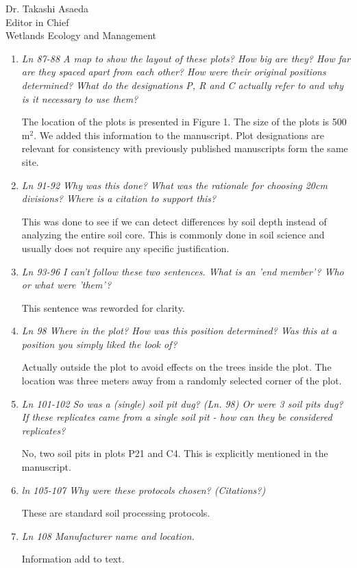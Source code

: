 \documentclass[11pt]{bgcletter}
\begin{document}
\begin{letter}{Dr. Takashi Asaeda\\
 Editor in Chief \\ Wetlands Ecology and Management}
\begin{enumerate}
\item {\it Ln 87-88 A map to show the layout of these plots? How big are they? How far are they spaced apart from each other? How were their original positions determined? What do the designations P, R and C actually refer to and why is it necessary to use them?}

{\color{blue} The location of the plots is presented in Figure 1. The size of the plots is 500 m$^2$. We added this information to the manuscript. Plot designations are relevant for consistency with previously published manuscripts form the same site. } 

\item {\it Ln 91-92 Why was this done? What was the rationale for choosing 20cm divisions? Where is a citation to support this?}

{\color{blue} This was done to see if we can detect differences by soil depth instead of analyzing the entire soil core. This is commonly done in soil science and usually does not require any specific justification.}


\item {\it Ln 93-96 I can't follow these two sentences. What is an 'end member'? Who or what were 'them'?}

{\color{blue} This sentence was reworded for clarity.}

\item {\it Ln 98 Where in the plot? How was this position determined? Was this at a position you simply liked the look of?}

{\color{blue} Actually outside the plot to avoid effects on the trees inside the plot. The location was three meters away from a randomly selected corner of the plot. }

\item {\it Ln 101-102 So was a (single) soil pit dug? (Ln. 98) Or were 3 soil pits dug? If these replicates came from a single soil pit - how can they be considered replicates?}

{\color{blue} No, two soil pits in plots P21 and C4. This is explicitly mentioned in the manuscript.}

\item {\it ln 105-107 Why were these protocols chosen? (Citations?)}

{\color{blue} These are standard soil processing protocols.}

\item {\it Ln 108 Manufacturer name and location.}

{\color{blue} Information add to text.}


\end{enumerate}
\end{letter}
\end{document}
